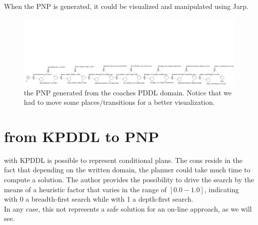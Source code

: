 \documentclass[pdftex,12pt,a4paper]{report}
\begin{document}
\noindent When the PNP is generated, it could be visualized and manipulated using Jarp.

\newpage
\begin{figure}[H]
	\centering
	\includegraphics[scale=0.35, angle=270, trim=100mm -100mm 0mm 0mm]{images/coaches_pddl.png}
	\caption{the PNP generated from the coaches PDDL domain. Notice that we had to move some places/transitions for a better visualization.}
\end{figure}
\newpage

\section{from KPDDL to PNP}
\noindent with KPDDL is possible to represent conditional plans. The cons reside in the fact that depending on the written domain, the planner could take much time to compute a solution. The author provides the possibility to drive the search by the means of a heuristic factor that varies in the range of $[0.0 - 1.0]$, indicating with 0 a breadth-first search while with 1 a depth-first search.\\ 
In any case, this not represents a safe solution for an on-line approach, as we will see.
\end{document}
